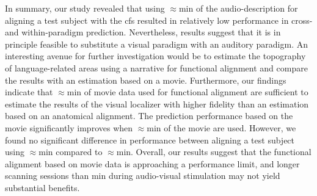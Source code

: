 %
In summary, our study revealed that using $\approx$\unit[15]{min} of the
audio-description for aligning a test subject with the \ac{cfs} resulted in
relatively low performance in cross- and within-paradigm prediction.
%
Nevertheless, results suggest that it is in principle feasible to substitute a
visual paradigm with an auditory paradigm.
%
An interesting avenue for further investigation would be to estimate the
topography of language-related areas using a narrative for functional alignment
and compare the results with an estimation based on a movie.
%
Furthermore, our findings indicate that $\approx$\unit[15]{min} of movie data
used for functional alignment are sufficient to estimate the results of the
visual localizer with higher fidelity than an estimation based on an anatomical
alignment.
%
The prediction performance based on the movie significantly improves when
$\approx$\unit[30]{min} of the movie are used.
%
However, we found no significant difference in performance between aligning a
test subject using $\approx$\unit[45]{min} compared to $\approx$\unit[30]{min}.
%
Overall, our results suggest that the functional alignment based on movie data
is approaching a performance limit, and longer scanning sessions than
\unit[30]{min} during audio-visual stimulation may not yield substantial
benefits.


